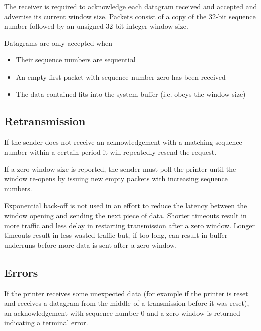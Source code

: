 			The receiver is required to acknowledge each datagram received and
			accepted and advertise its current window size. Packets consist of a copy
			of the 32-bit sequence number followed by an unsigned 32-bit integer
			window size.
			
			Datagrams are only accepted when
			\begin{itemize}
				
				\item Their sequence numbers are sequential
				
				\item An empty first packet with sequence number zero has been received
				
				\item The data contained fits into the system buffer (i.e. obeys the
				window size)
				
			\end{itemize}
			
		\subsection{Retransmission}
			
			If the sender does not receive an acknowledgement with a matching sequence
			number within a certain period it will repeatedly resend the request.
			
			If a zero-window size is reported, the sender must poll the printer until
			the window re-opens by issuing new empty packets with increasing sequence
			numbers.
			
			Exponential back-off is not used in an effort to reduce the latency
			between the window opening and sending the next piece of data. Shorter
			timeouts result in more traffic and less delay in restarting transmission
			after a zero window. Longer timeouts result in less wasted traffic but, if
			too long, can result in buffer underruns before more data is sent after a
			zero window.
			
		\subsection{Errors}
			
			If the printer receives some unexpected data (for example if the printer
			is reset and receives a datagram from the middle of a transmission before
			it was reset), an acknowledgement with sequence number 0 and a zero-window
			is returned indicating a terminal error.
			

